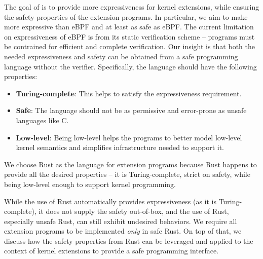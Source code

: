 The goal of \projname{} is to provide more expressiveness for kernel extensions,
    while ensuring the safety properties of the extension programs.
In particular, we aim to make \projname{} more expressive than eBPF and at least
    as safe as eBPF.
The current limitation on expressiveness of eBPF is from its static
    verification scheme -- programs must be contrained for efficient and
    complete verification.
Our insight is that both the needed expressiveness and safety can be obtained
    from a safe programming language without the verifier.
Specifically, the language should have the following properties:
\begin{itemize}
    \item \textbf{Turing-complete}: This helps to satisfy the expressiveness
        requirement.
    \item \textbf{Safe}: The language should not be as permissive and
        error-prone as unsafe languages like C.
    \item \textbf{Low-level}: Being low-level helps the programs to better
        model low-level kernel semantics and simplifies infrastructure needed
        to support it.
\end{itemize}
We choose Rust as the language for extension programs because Rust happens to
    provide all the desired properties -- it is Turing-complete, strict on
    safety, while being low-level enough to support kernel programming.

While the use of Rust automatically provides expressiveness (as it is
    Turing-complete), it does not supply the safety out-of-box, and the use of
    Rust, especially unsafe Rust, can still exhibit undesired behaviors.
We require all extension programs to be implemented \textit{only} in safe Rust.
On top of that, we discuss how the safety properties from Rust can be leveraged
    and applied to the context of kernel extensions to provide a safe
    programming interface.

